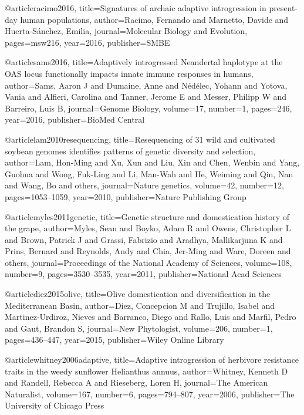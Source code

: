 @article{racimo2016,
  title={Signatures of archaic adaptive introgression in present-day human populations},
  author={Racimo, Fernando and Marnetto, Davide and Huerta-S{\'a}nchez, Emilia},
  journal={Molecular Biology and Evolution},
  pages={msw216},
  year={2016},
  publisher={SMBE}
}

@article{sams2016,
  title={Adaptively introgressed Neandertal haplotype at the OAS locus functionally impacts innate immune responses in humans},
  author={Sams, Aaron J and Dumaine, Anne and N{\'e}d{\'e}lec, Yohann and Yotova, Vania and Alfieri, Carolina and Tanner, Jerome E and Messer, Philipp W and Barreiro, Luis B},
  journal={Genome Biology},
  volume={17},
  number={1},
  pages={246},
  year={2016},
  publisher={BioMed Central}
}

@article{lam2010resequencing,
  title={Resequencing of 31 wild and cultivated soybean genomes identifies patterns of genetic diversity and selection},
  author={Lam, Hon-Ming and Xu, Xun and Liu, Xin and Chen, Wenbin and Yang, Guohua and Wong, Fuk-Ling and Li, Man-Wah and He, Weiming and Qin, Nan and Wang, Bo and others},
  journal={Nature genetics},
  volume={42},
  number={12},
  pages={1053--1059},
  year={2010},
  publisher={Nature Publishing Group}
}

@article{myles2011genetic,
  title={Genetic structure and domestication history of the grape},
  author={Myles, Sean and Boyko, Adam R and Owens, Christopher L and Brown, Patrick J and Grassi, Fabrizio and Aradhya, Mallikarjuna K and Prins, Bernard and Reynolds, Andy and Chia, Jer-Ming and Ware, Doreen and others},
  journal={Proceedings of the National Academy of Sciences},
  volume={108},
  number={9},
  pages={3530--3535},
  year={2011},
  publisher={National Acad Sciences}
}

@article{diez2015olive,
  title={Olive domestication and diversification in the Mediterranean Basin},
  author={Diez, Concepcion M and Trujillo, Isabel and Martinez-Urdiroz, Nieves and Barranco, Diego and Rallo, Luis and Marfil, Pedro and Gaut, Brandon S},
  journal={New Phytologist},
  volume={206},
  number={1},
  pages={436--447},
  year={2015},
  publisher={Wiley Online Library}
}

@article{whitney2006adaptive,
  title={Adaptive introgression of herbivore resistance traits in the weedy sunflower Helianthus annuus},
  author={Whitney, Kenneth D and Randell, Rebecca A and Rieseberg, Loren H},
  journal={The American Naturalist},
  volume={167},
  number={6},
  pages={794--807},
  year={2006},
  publisher={The University of Chicago Press}
}

